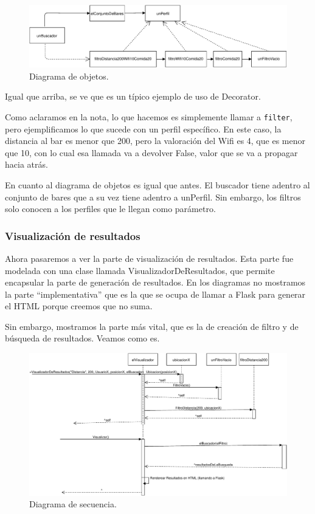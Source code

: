 \begin{figure}[H]
  \centering
  \includegraphics[width=\textwidth]{diagramas/objetos_3.pdf}
  \caption{\normalfont Diagrama de objetos.}
\end{figure}


Igual que arriba, se ve que es un típico ejemplo de uso de Decorator.

Como aclaramos en la nota, lo que hacemos es simplemente llamar a \texttt{filter}, pero ejemplificamos lo que sucede con un perfil específico. En este caso, la distancia al bar es menor que 200, pero la valoración del Wifi es 4, que es menor que 10, con lo cual esa llamada va a devolver False, valor que se va a propagar hacia atrás.

En cuanto al diagrama de objetos es igual que antes. El buscador tiene adentro al conjunto de bares que a su vez tiene adentro a unPerfil. Sin embargo, los filtros solo conocen a los perfiles que le llegan como parámetro.

\subsubsection{Visualización de resultados}

Ahora pasaremos a ver la parte de visualización de resultados. Esta parte fue modelada con una clase llamada VisualizadorDeResultados, que permite encapsular la parte de generación de resultados. En los diagramas no mostramos la parte ``implementativa'' que es la que se ocupa de llamar a Flask para generar el HTML porque creemos que no suma.

Sin embargo, mostramos la parte más vital, que es la de creación de filtro y de búsqueda de resultados. Veamos como es.

\begin{figure}[H]
  \centering
  \includegraphics[width=\textwidth]{diagramas/secuencia_4.pdf}
  \caption{\normalfont Diagrama de secuencia.}
\end{figure}

